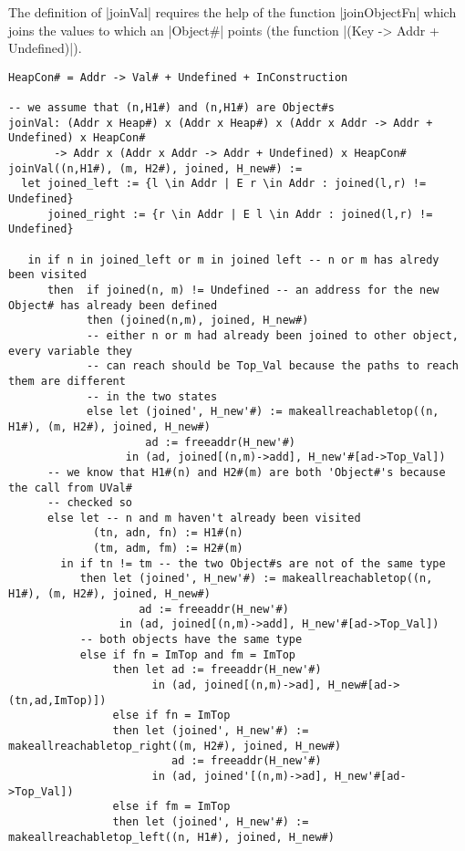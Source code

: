 The definition of \pycode|joinVal| requires the help of the function
\pycode|joinObjectFn| which joins the values to which an
\pycode|Object#| points (the function
\pycode|(Key -> Addr + Undefined)|).

\begin{verbatim}
HeapCon# = Addr -> Val# + Undefined + InConstruction

-- we assume that (n,H1#) and (n,H1#) are Object#s
joinVal: (Addr x Heap#) x (Addr x Heap#) x (Addr x Addr -> Addr + Undefined) x HeapCon#
       -> Addr x (Addr x Addr -> Addr + Undefined) x HeapCon#
joinVal((n,H1#), (m, H2#), joined, H_new#) :=
  let joined_left := {l \in Addr | E r \in Addr : joined(l,r) != Undefined}
      joined_right := {r \in Addr | E l \in Addr : joined(l,r) != Undefined}

   in if n in joined_left or m in joined left -- n or m has alredy been visited
      then  if joined(n, m) != Undefined -- an address for the new Object# has already been defined
            then (joined(n,m), joined, H_new#)
            -- either n or m had already been joined to other object, every variable they
            -- can reach should be Top_Val because the paths to reach them are different
            -- in the two states
            else let (joined', H_new'#) := makeallreachabletop((n, H1#), (m, H2#), joined, H_new#)
                     ad := freeaddr(H_new'#)
                  in (ad, joined[(n,m)->add], H_new'#[ad->Top_Val])
      -- we know that H1#(n) and H2#(m) are both 'Object#'s because the call from UVal#
      -- checked so
      else let -- n and m haven't already been visited
             (tn, adn, fn) := H1#(n)
             (tm, adm, fm) := H2#(m)
        in if tn != tm -- the two Object#s are not of the same type
           then let (joined', H_new'#) := makeallreachabletop((n, H1#), (m, H2#), joined, H_new#)
                    ad := freeaddr(H_new'#)
                 in (ad, joined[(n,m)->add], H_new'#[ad->Top_Val])
           -- both objects have the same type
           else if fn = ImTop and fm = ImTop
                then let ad := freeaddr(H_new'#)
                      in (ad, joined[(n,m)->ad], H_new#[ad->(tn,ad,ImTop)])
                else if fn = ImTop
                then let (joined', H_new'#) := makeallreachabletop_right((m, H2#), joined, H_new#)
                         ad := freeaddr(H_new'#)
                      in (ad, joined'[(n,m)->ad], H_new'#[ad->Top_Val])
                else if fm = ImTop
                then let (joined', H_new'#) := makeallreachabletop_left((n, H1#), joined, H_new#)

\end{verbatim}
